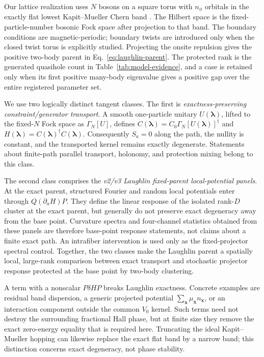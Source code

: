Our lattice realization uses $N$ bosons on a square torus with $n_\phi$
orbitals in the exactly flat lowest Kapit--Mueller Chern band
\cite{kapitmueller2010}.  The Hilbert space is the fixed-particle-number
bosonic Fock space after projection to that band.  The boundary conditions are
magnetic-periodic; boundary twists are introduced only when the closed twist
torus is explicitly studied.  Projecting the onsite repulsion gives the
positive two-body parent in Eq.~\eqref{eq:laughlin-parent}.  The protected rank
is the generated quasihole count in Table~\ref{tab:model-evidence}, and a case
is retained only when its first positive many-body eigenvalue gives a positive
gap over the entire registered parameter set.

We use two logically distinct tangent classes.  The first is
\emph{exactness-preserving constraint/generator transport}.  A smooth
one-particle unitary $U(\boldsymbol\lambda)$, lifted to the fixed-$N$ Fock
space as $\Gamma_N[U]$, defines
$C(\boldsymbol\lambda)=C_0\Gamma_N[U(\boldsymbol\lambda)]^\dagger$ and
$H(\boldsymbol\lambda)=C(\boldsymbol\lambda)^\dagger
C(\boldsymbol\lambda)$.  Consequently $S_a=0$ along the path, the nullity is
constant, and the transported kernel remains exactly degenerate.  Statements
about finite-path parallel transport, holonomy, and protection mixing belong
to this class.

The second class comprises the \emph{v2/v3 Laughlin fixed-parent
local-potential panels}.  At the exact parent, structured Fourier and random
local potentials enter through $Q(\partial_aH)P$.  They define the linear
response of the isolated rank-$D$ cluster at the exact parent, but generally
do not preserve exact degeneracy away from the base point.  Curvature spectra
and four-channel statistics obtained from these panels are therefore
base-point response statements, not claims about a finite exact path.  An
intrafiber intervention is used only as the fixed-projector spectral control.
Together, the two classes make the Laughlin parent a spatially local,
large-rank comparison between exact transport and stochastic projector
response protected at the base point by two-body clustering.

A term with a nonscalar $P\delta HP$ breaks Laughlin exactness.  Concrete
examples are residual band dispersion, a generic projected potential
$\sum_{\bm x}\mu_{\bm x}n_{\bm x}$, or an interaction component outside the
common $V_0$ kernel.  Such terms need not destroy the surrounding fractional
Hall phase, but at finite size they remove the exact zero-energy equality that
is required here.  Truncating the ideal Kapit--Mueller hopping can likewise
replace the exact flat band by a narrow band; this distinction concerns exact
degeneracy, not phase stability.


